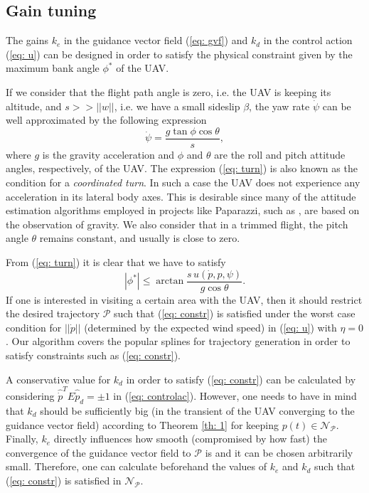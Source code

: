 \documentclass[letterpaper, 10 pt, conference]{ieeeconf}  %
\begin{document}
\subsection{Gain tuning}
The gains $k_e$ in the guidance vector field (\ref{eq: gvf}) and $k_d$ in the control action (\ref{eq: u}) can be designed in order to satisfy the physical constraint given by the maximum bank angle $\phi^*$ of the UAV. 

If we consider that the flight path angle is zero, i.e. the UAV is keeping its altitude, and $s >> ||w||$, i.e. we have a small sideslip $\beta$, the yaw rate $\dot\psi$ can be well approximated by the following expression \cite{stevens2015aircraft}
\begin{equation}
	\dot\psi = \frac{g\tan\phi \cos\theta}{s},
	\label{eq: turn}
\end{equation}
where $g$ is the gravity acceleration and $\phi$ and $\theta$ are the roll and pitch attitude angles, respectively, of the UAV. The expression (\ref{eq: turn}) is also known as the condition for a \emph{coordinated turn}. In such a case the UAV does not experience any acceleration in its lateral body axes. This is desirable since many of the attitude estimation algorithms employed in projects like Paparazzi, such as \cite{de2012uav,condomines2015pi}, are based on the observation of gravity. We also consider that in a trimmed flight, the pitch angle $\theta$ remains constant, and usually is close to zero.

From (\ref{eq: turn}) it is clear that we have to satisfy
\begin{equation}
	|\phi^*| \leq \arctan \frac{s\, u(\dot p, p, \psi)}{g \cos\theta}.
	\label{eq: constr}
\end{equation}
If one is interested in visiting a certain area with the UAV, then it should restrict the desired trajectory $\mathcal{P}$ such that (\ref{eq: constr}) is satisfied under the worst case condition for $||\dot p||$ (determined by the expected wind speed) in (\ref{eq: u}) with $\eta = 0$. Our algorithm covers the popular splines \cite{gill2015spline} for trajectory generation in order to satisfy constraints such as (\ref{eq: constr}).

A conservative value for $k_d$ in order to satisfy (\ref{eq: constr}) can be calculated by considering $\hat{\dot p}^TE\hat{\dot p}_d = \pm 1$ in (\ref{eq: controlac}). However, one needs to have in mind that $k_d$ should be sufficiently big (in the transient of the UAV converging to the guidance vector field) according to Theorem \ref{th: 1} for keeping $p(t)\in\mathcal{N}_{\mathcal{P}}$. Finally, $k_e$ directly influences how smooth (compromised by how fast) the convergence of the guidance vector field to $\mathcal{P}$ is and it can be chosen arbitrarily small. Therefore, one can calculate beforehand the values of $k_e$ and $k_d$ such that (\ref{eq: constr}) is satisfied in $\mathcal{N}_{\mathcal{P}}$.
\end{document}
